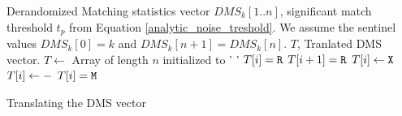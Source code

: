 \begin{algorithm}
\begin{algorithmic}[1]
\small
\Require Derandomized Matching statistics vector $DMS_k[1..n]$, significant match threshold $t_p$ from Equation \ref{analytic_noise_treshold}. We assume the sentinel values $DMS_k[0] = k$ and $DMS_k[n+1] = DMS_k[n]$.
\Ensure $T$, Tranlated DMS vector.%
\State $T \leftarrow $ Array of length $n$ initialized to ' '
\State $T[i] = {\tt R}$
\State $T[i+1] = {\tt R}$ 
 
    \State $T[i] \gets {\tt X}$
    \Else
    \State $T[i] \gets {\tt -}$
    \EndIf
\Else
    \State $T[i] = {\tt M}$ 
\EndIf
\EndIf
\EndFor
\caption{\small Translating the DMS vector} 
\label{alg:tranlating-DMS}
\end{algorithmic}
\end{algorithm}
